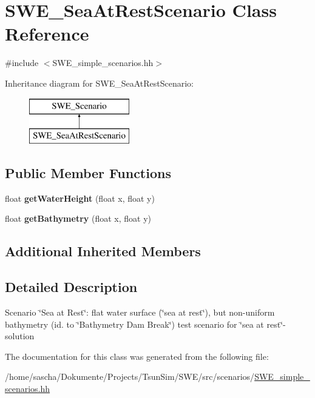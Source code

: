 \hypertarget{classSWE__SeaAtRestScenario}{\section{S\-W\-E\-\_\-\-Sea\-At\-Rest\-Scenario Class Reference}
\label{classSWE__SeaAtRestScenario}
}


{\ttfamily \#include $<$S\-W\-E\-\_\-simple\-\_\-scenarios.\-hh$>$}

Inheritance diagram for S\-W\-E\-\_\-\-Sea\-At\-Rest\-Scenario\-:\begin{figure}[H]
\begin{center}
\leavevmode
\includegraphics[height=2.000000cm]{classSWE__SeaAtRestScenario}
\end{center}
\end{figure}
\subsection*{Public Member Functions}
\begin{DoxyCompactItemize}
\item 
\hypertarget{classSWE__SeaAtRestScenario_a0d493a2c96cde62cc71035c5f62717d1}{float {\bfseries get\-Water\-Height} (float x, float y)}\label{classSWE__SeaAtRestScenario_a0d493a2c96cde62cc71035c5f62717d1}

\item 
\hypertarget{classSWE__SeaAtRestScenario_a738776f758bb5b914ede2e6f57cb3ffd}{float {\bfseries get\-Bathymetry} (float x, float y)}\label{classSWE__SeaAtRestScenario_a738776f758bb5b914ede2e6f57cb3ffd}

\end{DoxyCompactItemize}
\subsection*{Additional Inherited Members}


\subsection{Detailed Description}
Scenario \char`\"{}\-Sea at Rest\char`\"{}\-: flat water surface (\char`\"{}sea at rest\char`\"{}), but non-\/uniform bathymetry (id. to \char`\"{}\-Bathymetry Dam Break\char`\"{}) test scenario for \char`\"{}sea at rest\char`\"{}-\/solution 

The documentation for this class was generated from the following file\-:\begin{DoxyCompactItemize}
\item 
/home/sascha/\-Dokumente/\-Projects/\-Tsun\-Sim/\-S\-W\-E/src/scenarios/\hyperlink{SWE__simple__scenarios_8hh}{S\-W\-E\-\_\-simple\-\_\-scenarios.\-hh}\end{DoxyCompactItemize}

